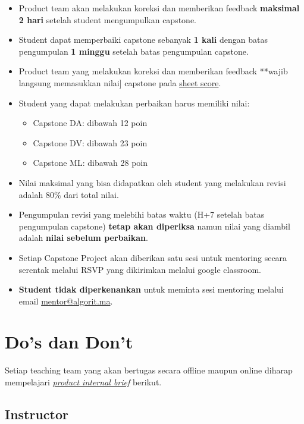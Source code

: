 \documentclass[
]{book}
\providecommand{\tightlist}{%
  \setlength{\itemsep}{0pt}\setlength{\parskip}{0pt}}
\begin{document}
\begin{itemize}
\item
  Product team akan melakukan koreksi dan memberikan feedback \textbf{maksimal 2 hari} setelah student mengumpulkan capstone.
\item
  Student dapat memperbaiki capstone sebanyak \textbf{1 kali} dengan batas pengumpulan \textbf{1 minggu} setelah batas pengumpulan capstone.
\item
  Product team yang melakukan koreksi dan memberikan feedback **wajib langsung memasukkan nilai{]} capstone pada \href{https://docs.google.com/spreadsheets/d/1cGJ0pn9k9gKCBnceWVwaL9D7BBDMNjLh8uPYlaBlJi8/edit?usp=sharing}{sheet score}.
\item
  Student yang dapat melakukan perbaikan harus memiliki nilai:

  \begin{itemize}
  \tightlist
  \item
    Capstone DA: dibawah 12 poin
  \item
    Capstone DV: dibawah 23 poin
  \item
    Capstone ML: dibawah 28 poin
  \end{itemize}
\item
  Nilai maksimal yang bisa didapatkan oleh student yang melakukan revisi adalah 80\% dari total nilai.
\item
  Pengumpulan revisi yang melebihi batas waktu (H+7 setelah batas pengumpulan capstone) \textbf{tetap akan diperiksa} namun nilai yang diambil adalah \textbf{nilai sebelum perbaikan}.
\item
  Setiap Capstone Project akan diberikan satu sesi untuk mentoring secara serentak melalui RSVP yang dikirimkan melalui google classroom.
\item
  \textbf{Student tidak diperkenankan} untuk meminta sesi mentoring melalui email \url{mentor@algorit.ma}.
\end{itemize}

\hypertarget{dos-dan-dont}{%
\chapter{Do's dan Don't}\label{dos-dan-dont}}

Setiap teaching team yang akan bertugas secara offline maupun online diharap mempelajari \href{https://docs.google.com/presentation/d/17f0z3x9RhJCjarY1yY3vWyW23kr-gSHHhTNdtd97BnM/edit?usp=sharing}{\emph{product internal brief}} berikut.

\hypertarget{instructor}{%
\section{Instructor}\label{instructor}}
\end{document}
